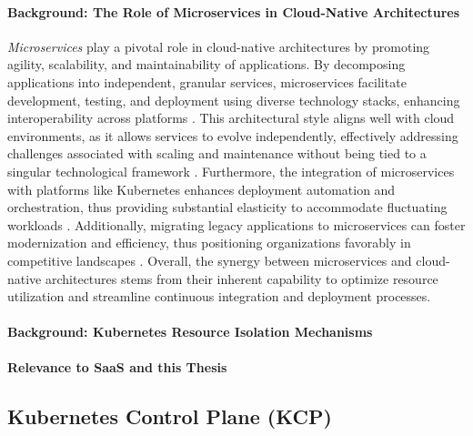 \documentclass[11pt, a4paper, oneside, draft]{scrartcl}
\begin{document}
            \paragraph{Background: The Role of Microservices in Cloud-Native Architectures}
                \textit{Microservices} play a pivotal role in cloud-native architectures by
                promoting agility, scalability, and maintainability of applications.
                By decomposing applications into independent, granular services, microservices
                facilitate development, testing, and deployment using diverse technology stacks,
                enhancing interoperability across platforms
                \parencites[p.~1]{waseem2020}[p.~1]{larrucea2018}.
                This architectural style aligns well with cloud environments, as it allows services
                to evolve independently, effectively addressing challenges associated with scaling
                and maintenance without being tied to a singular technological framework
                \parencite[pp.~202--203]{balalaie2016}.
                Furthermore, the integration of microservices with platforms like Kubernetes
                enhances deployment automation and orchestration, thus providing substantial
                elasticity to accommodate fluctuating workloads
                \parencite[p.~170]{haugeland2021}.
                Additionally, migrating legacy applications to microservices can foster
                modernization and efficiency, thus positioning organizations favorably in
                competitive landscapes \parencite[p.~214]{balalaie2016}.
                Overall, the synergy between microservices and cloud-native architectures stems from
                their inherent capability to optimize resource utilization and streamline continuous
                integration and deployment processes.

            \paragraph{Background: Kubernetes Resource Isolation Mechanisms}

            \paragraph{Relevance to SaaS and this Thesis}

        \subsection{Kubernetes Control Plane (KCP)}
\end{document}
